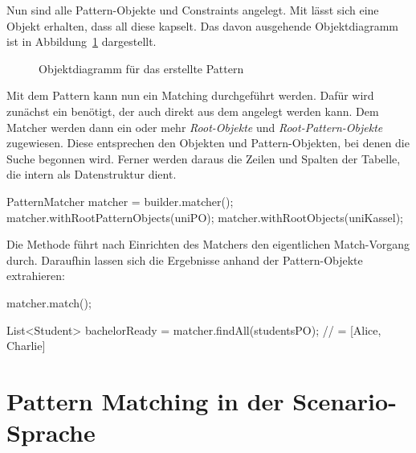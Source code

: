 Nun sind alle Pattern-Objekte und Constraints angelegt.
Mit  lässt sich eine Objekt erhalten, dass all diese kapselt.
Das davon ausgehende Objektdiagramm ist in Abbildung~\ref{fig:pattern-diagram} dargestellt.

\begin{figure}
    \caption{Objektdiagramm für das erstellte Pattern}
    \label{fig:pattern-diagram}
\end{figure}

Mit dem Pattern kann nun ein Matching durchgeführt werden.
Dafür wird zunächst ein  benötigt, der auch direkt aus dem  angelegt werden kann.
Dem Matcher werden dann ein oder mehr \emph{Root-Objekte} und \emph{Root-Pattern-Objekte} zugewiesen.
Diese entsprechen den Objekten und Pattern-Objekten, bei denen die Suche begonnen wird.
Ferner werden daraus die Zeilen und Spalten der Tabelle, die intern als Datenstruktur dient.

\begin{jcodeblock}
    PatternMatcher matcher = builder.matcher();
    matcher.withRootPatternObjects(uniPO);
    matcher.withRootObjects(uniKassel);
\end{jcodeblock}

Die Methode  führt nach Einrichten des Matchers den eigentlichen Match-Vorgang durch.
Daraufhin lassen sich die Ergebnisse anhand der Pattern-Objekte extrahieren:

\begin{jcodeblock}
    matcher.match();

    List<Student> bachelorReady = matcher.findAll(studentsPO);
    // = [Alice, Charlie]
\end{jcodeblock}


\section{Pattern Matching in der Scenario-Sprache}\label{sec:scenario-pattern-matching}

